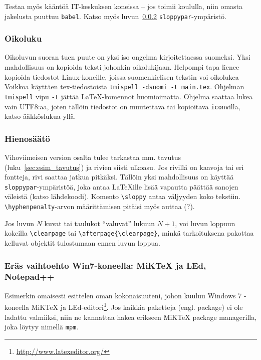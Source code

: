 Testaa myös kääntöä IT-keskuksen koneissa -- jos
toimii koululla, niin omasta jakelusta puuttuu \verb!babel!.
Katso myös luvun~\ref{sec:hienos} \verb!sloppypar!-ympäristö.

\subsubsection{Oikoluku}

Oikoluvun suoran tuen puute on yksi iso ongelma kirjoitettaessa suomeksi.
Yksi mahdollisuus on kopioida teksti johonkin oikolukijaan. Helpompi
tapa lienee kopioida tiedostot Linux-koneille, joissa
suomenkielisen tekstin voi oikolukea Voikkoa käyttäen tex-tiedostoista
\verb!tmispell -dsuomi -t main.tex!.
Ohjelman \verb!tmispell! vipu \verb!-t! jättää \LaTeX{}-komennot
huomioimatta. Ohjelma saattaa lukea vain UTF8:aa, joten 
tällöin tiedostot on muutettava tai kopioitava \verb!iconv!illa,
katso ääkköslukua yllä.

\subsubsection{Hienosäätö}
\label{sec:hienos}

\begin{sloppypar}
  Vihoviimeisen version osalta tulee tarkastaa mm. tavutus
  (luku~\ref{sec:esim_tavutus}) ja rivien siisti ulkoasu.  Jos rivillä
  on kaavoja tai eri fontteja, rivi saattaa jatkua pitkäksi. Tällöin
  yksi mahdollisuus on käyttää \verb!sloppypar!-ympäristöä, joka antaa
  \LaTeX{}ille lisää vapautta päättää sanojen väleistä (katso
  lähdekoodi). Komento \verb!\sloppy! antaa väljyyden koko tekstiin.
  \verb!\hyphenpenalty!-arvon määrittämisen pitäisi myös
  auttaa (?).
\end{sloppypar}

Jos luvun $N$ kuvat tai taulukot ``valuvat'' lukuun $N+1$,
voi luvun loppuun kokeilla \verb!\clearpage! tai 
\verb!\afterpage{\clearpage}!, minkä tarkoituksena pakottaa
kelluvat objektit tulostumaan ennen luvun loppua.


\subsubsection{Eräs vaihtoehto Win7-koneella: MiKTeX ja LEd, Notepad++}
\label{sec:esimmiktex}

Esimerkin omaisesti esittelen oman kokonaisuuteni, johon kuuluu
Windows 7 -koneella MiKTeX ja
LEd-editori\footnote{\url{http://www.latexeditor.org/}}.  Jos kaikkia
paketteja (engl. package) ei ole ladattu valmiiksi, niin ne kannattaa
hakea erikseen MiKTeX package managerilla, joka löytyy nimellä
\verb!mpm!.

